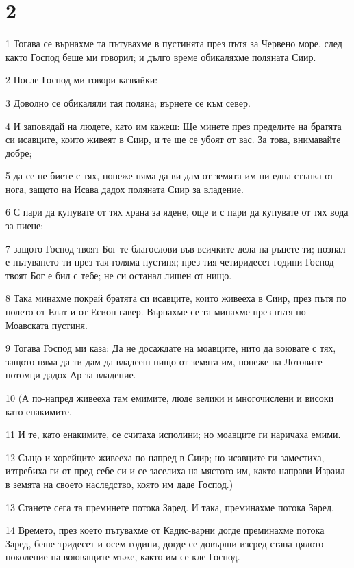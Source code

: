 \chapter{2}

\par 1 Тогава се върнахме та пътувахме в пустинята през пътя за Червено море, след както Господ беше ми говорил; и дълго време обикаляхме поляната Сиир.
\par 2 После Господ ми говори казвайки:
\par 3 Доволно се обикаляли тая поляна; върнете се към север.
\par 4 И заповядай на людете, като им кажеш: Ще минете през пределите на братята си исавците, които живеят в Сиир, и те ще се убоят от вас. За това, внимавайте добре;
\par 5 да се не биете с тях, понеже няма да ви дам от земята им ни една стъпка от нога, защото на Исава дадох поляната Сиир за владение.
\par 6 С пари да купувате от тях храна за ядене, още и с пари да купувате от тях вода за пиене;
\par 7 защото Господ твоят Бог те благослови във всичките дела на ръцете ти; познал е пътуването ти през тая голяма пустиня; през тия четиридесет години Господ твоят Бог е бил с тебе; не си останал лишен от нищо.
\par 8 Така минахме покрай братята си исавците, които живееха в Сиир, през пътя по полето от Елат и от Есион-гавер. Върнахме се та минахме през пътя по Моавската пустиня.
\par 9 Тогава Господ ми каза: Да не досаждате на моавците, нито да воювате с тях, защото няма да ти дам да владееш нищо от земята им, понеже на Лотовите потомци дадох Ар за владение.
\par 10 (А по-напред живееха там емимите, люде велики и многочислени и високи като енакимите.
\par 11 И те, като енакимите, се считаха исполини; но моавците ги наричаха емими.
\par 12 Също и хорейците живееха по-напред в Сиир; но исавците ги заместиха, изтребиха ги от пред себе си и се заселиха на мястото им, както направи Израил в земята на своето наследство, която им даде Господ.)
\par 13 Станете сега та преминете потока Заред. И така, преминахме потока Заред.
\par 14 Времето, през което пътувахме от Кадис-варни догде преминахме потока Заред, беше тридесет и осем години, догде се довърши изсред стана цялото поколение на воюващите мъже, както им се кле Господ.
